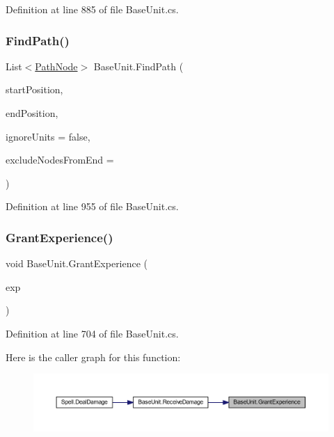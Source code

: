 Definition at line 885 of file Base\+Unit.\+cs.

\mbox{\label{class_base_unit_a7adf93eb6a52235a25e1344e401d05d2}} 
\subsubsection{\texorpdfstring{FindPath()}{FindPath()}}
{\footnotesize\ttfamily List$<$\mbox{\hyperlink{class_path_node}{Path\+Node}}$>$ Base\+Unit.\+Find\+Path (\begin{DoxyParamCaption}\item[{Vector2\+Int}]{start\+Position,  }\item[{Vector2\+Int}]{end\+Position,  }\item[{bool}]{ignore\+Units = {\ttfamily false},  }\item[{int}]{exclude\+Nodes\+From\+End = {} }\end{DoxyParamCaption})}



Definition at line 955 of file Base\+Unit.\+cs.

\mbox{\label{class_base_unit_a38fdc01e0ff77bcc22f10d4ce06d0e25}} 
\subsubsection{\texorpdfstring{GrantExperience()}{GrantExperience()}}
{\footnotesize\ttfamily void Base\+Unit.\+Grant\+Experience (\begin{DoxyParamCaption}\item[{int}]{exp }\end{DoxyParamCaption})}



Definition at line 704 of file Base\+Unit.\+cs.

Here is the caller graph for this function\+:
\nopagebreak
\begin{figure}[H]
\begin{center}
\leavevmode
\includegraphics[width=350pt]{class_base_unit_a38fdc01e0ff77bcc22f10d4ce06d0e25_icgraph}
\end{center}
\end{figure}
\mbox{\label{class_base_unit_a007c44552627a4ee773771383198077f}} 
